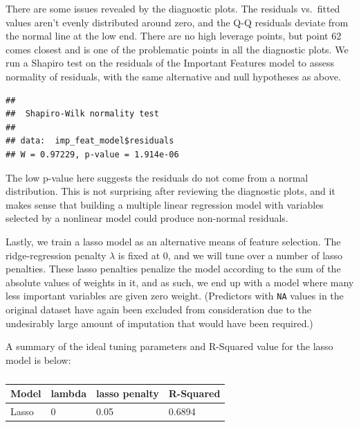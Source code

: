 \documentclass[
  man,floatsintext]{apa6}
\begin{document}
There are some issues revealed by the diagnostic plots. The residuals vs.~fitted values aren't evenly distributed around zero, and the Q-Q residuals deviate from the normal line at the low end. There are no high leverage points, but point 62 comes closest and is one of the problematic points in all the diagnostic plots. We run a Shapiro test on the residuals of the Important Features model to assess normality of residuals, with the same alternative and null hypotheses as above.

\begin{verbatim}
## 
##  Shapiro-Wilk normality test
## 
## data:  imp_feat_model$residuals
## W = 0.97229, p-value = 1.914e-06
\end{verbatim}

The low p-value here suggests the residuals do not come from a normal distribution. This is not surprising after reviewing the diagnostic plots, and it makes sense that building a multiple linear regression model with variables selected by a nonlinear model could produce non-normal residuals.

Lastly, we train a lasso model as an alternative means of feature selection. The ridge-regression penalty \(\lambda\) is fixed at 0, and we will tune over a number of lasso penalties. These lasso penalties penalize the model according to the sum of the absolute values of weights in it, and as such, we end up with a model where many less important variables are given zero weight. (Predictors with \texttt{NA} values in the original dataset have again been excluded from consideration due to the undesirably large amount of imputation that would have been required.)

A summary of the ideal tuning parameters and R-Squared value for the lasso model is below:

\begin{table}[H]

\begin{center}
\begin{threeparttable}

\caption{\label{tab:unnamed-chunk-11}}

\begin{tabular}{llll}
\toprule
Model & \multicolumn{1}{c}{lambda} & \multicolumn{1}{c}{lasso penalty} & \multicolumn{1}{c}{R-Squared}\\
\midrule
Lasso & 0 & 0.05 & 0.6894\\
\bottomrule
\end{tabular}

\end{threeparttable}
\end{center}

\end{table}
\end{document}
